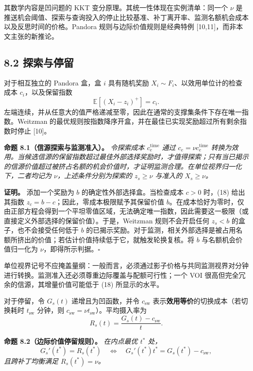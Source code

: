 \documentclass[
  chinese,
  11pt]{article}
\begin{document}
其数学内容是凹问题的 KKT 变分原理。其统一性体现在实例清单：同一个 \(\nu\) 是推送机会阈值、探索与查询投入的停止比较基准、补丁离开率、监测名额机会成本以及反思时间的价格。Pandora 规则与边际价值规则是经典特例 {[}10,11{]}，而非本文主张的新推论。

\subsection{8.2 探索与停留}\label{ux63a2ux7d22ux4e0eux505cux7559}

对于相互独立的 Pandora 盒，盒 \(i\) 具有随机奖励 \(X_i\sim F_i\)、以效用单位计的检查成本 \(c_i\)，以及保留指数 \[
\mathbb E[(X_i-z_i)^+]=c_i.
\tag{18}
\] 左端连续，并从任意大的值严格递减至零，因此在通常的支撑集条件下存在唯一指数。Weitzman 的最优规则按指数降序开盒，并在最佳已实现奖励超过所有剩余指数时停止 {[}10{]}。

\textbf{命题 8.1（信源探索与监测准入）。} \emph{令探索成本 \(c_e^{\mathrm{time}}\) 通过 \(c_e=\nu c_e^{\mathrm{time}}\) 转换为效用。当候选信源的保留指数超过最佳外部选择奖励时，才值得探索；只有当已揭示的信源价值超过被挤占名额的机会价值时，才证明监测合理。在单位视界归一化下，二者均记为 \(\nu\)，上述条件分别为探索的 \(z_s\geq\nu\) 与准入的 \(X_s\geq\nu\)。}

\textbf{证明。} 添加一个奖励为 \(b\) 的确定性外部选择盒。当检查成本 \(c>0\) 时，(18) 给出其指数 \(z_c=b-c\)；因此，零成本极限赋予其保留价值 \(b\)。在成本恰好为零时，仅由正部方程会得到一个平坦零值区域，无法确定唯一指数，因此需要这一极限（或直接定义外部选择的保留价值）。于是，Weitzman 规则不会开启任何 \(z_s<b\) 的盒子，也不会接受任何低于 \(b\) 的已揭示奖励。对于监测，相关外部选择是被占用名额所挤出的价值；若估计价值持续低于它，就触发轮换复核。将 \(b\) 与名额机会价值归一化为 \(\nu\)，即得所示判据。\(\square\)

单位视界记号不应掩盖量纲：一般而言，必须通过影子价格与共同监测视界对分钟进行转换。监测准入还必须尊重边际覆盖与配额可行性；一个 VOI 很高但完全冗余的信源，其增量价值可能低于 (18) 所显示的水平。

对于停留，令 \(G_s(t)\) 递增且为凹函数，并令 \(c_{\mathrm{sw}}\) 表示\textbf{效用等价}的切换成本（若切换耗时 \(t_{\mathrm{sw}}\) 分钟，则 \(c_{\mathrm{sw}}=\nu t_{\mathrm{sw}}\)）。平均摄入率为 \[
R_s(t)=\frac{G_s(t)-c_{\mathrm{sw}}}{t}.
\]

\textbf{命题 8.2（边际价值停留规则）。} \emph{在内点最优 \(t^*\) 处，} \[
G_s'(t^*)=R_s(t^*)
\quad\Longleftrightarrow\quad
G_s'(t^*)t^*=G_s(t^*)-c_{\mathrm{sw}},
\tag{19}
\] \emph{且跨补丁均衡满足 \(R_s(t^*)=\nu\)。}
\end{document}
